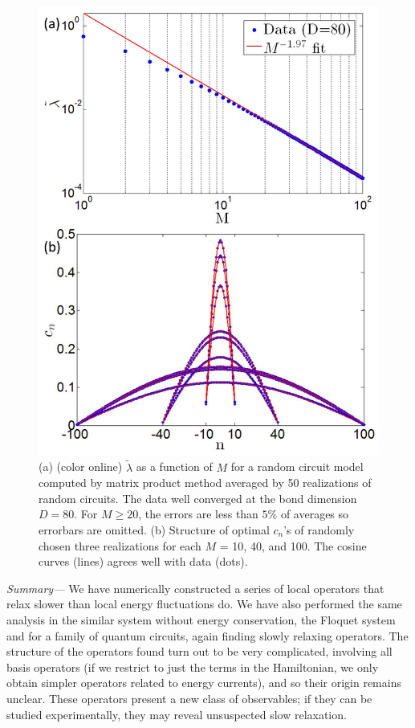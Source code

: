 \documentclass[twocolumn,superscriptaddress, prb]{revtex4-1}
\begin{document}
\begin{figure}
\includegraphics[width=1.0\linewidth]{random_circuit_MPO.pdf}
\centering
\caption{(a) (color online) $\tilde{\lambda}$ as a function of $M$ for a random circuit model computed by matrix product method averaged by 50 realizations of random circuits. The data well converged at the bond dimension $D = 80$. For $M \geq 20$, the errors are less than $5\%$ of averages so errorbars are omitted.   (b) Structure of optimal $c_n$'s of randomly chosen three realizations for each $M$ = 10, 40, and 100. The cosine curves (lines) agrees well with data (dots). }
\label{fig:mpo}
\end{figure}

{\it Summary---}
We have numerically constructed a series of local operators that relax slower than local energy fluctuations do.
We have also performed the same analysis in the similar system without energy conservation,
the Floquet system and for a family of quantum circuits, again finding slowly relaxing operators.
The structure of the operators found turn out to be very complicated, involving all basis operators 
(if we restrict to just the terms in the Hamiltonian, we only obtain simpler operators related to energy currents), 
and so their origin remains unclear. 
These operators present a new class of observables; if they can be studied experimentally, they may reveal unsuspected slow relaxation.
\end{document}
